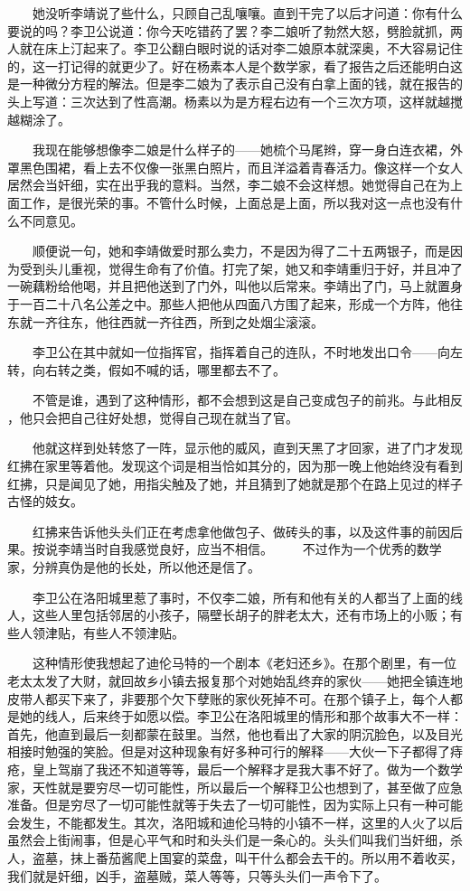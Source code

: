 　　她没听李靖说了些什么，只顾自己乱嚷嚷。直到干完了以后才问道：你有什么 要说的吗？李卫公说道：你今天吃错药了罢？李二娘听了勃然大怒，劈脸就抓，两 人就在床上汀起来了。李卫公翻白眼时说的话对李二娘原本就深奥，不大容易记住 的，这一打记得的就更少了。好在杨素本人是个数学家，看了报告之后还能明白这 是一种微分方程的解法。但是李二娘为了表示自己没有白拿上面的钱，就在报告的 头上写道：三次达到了性高潮。杨素以为是方程右边有一个三次方项，这样就越搅 越糊涂了。 

　　我现在能够想像李二娘是什么样子的——她梳个马尾辫，穿一身白连衣裙，外 罩黑色围裙，看上去不仅像一张黑白照片，而且洋溢着青春活力。像这样一个女人 居然会当奸细，实在出乎我的意料。当然，李二娘不会这样想。她觉得自己在为上 面工作，是很光荣的事。不管什么时候，上面总是上面，所以我对这一点也没有什 么不同意见。

 　　顺便说一句，她和李靖做爱时那么卖力，不是因为得了二十五两银子，而是因 为受到头儿重视，觉得生命有了价值。打完了架，她又和李靖重归于好，并且冲了 一碗藕粉给他喝，并且把他送到了门外，叫他以后常来。李靖出了门，马上就置身 于一百二十八名公差之中。那些人把他从四面八方围了起来，形成一个方阵，他往 东就一齐往东，他往西就一齐往西，所到之处烟尘滚滚。

 　　李卫公在其中就如一位指挥官，指挥着自己的连队，不时地发出口令——向左 转，向右转之类，假如不喊的话，哪里都去不了。

 　　不管是谁，遇到了这种情形，都不会想到这是自己变成包子的前兆。与此相反 ，他只会把自己往好处想，觉得自己现在就当了官。

 　　他就这样到处转悠了一阵，显示他的威风，直到天黑了才回家，进了门才发现 红拂在家里等着他。发现这个词是相当恰如其分的，因为那一晚上他始终没有看到 红拂，只是闻见了她，用指尖触及了她，并且猜到了她就是那个在路上见过的样子 古怪的妓女。

 　　红拂来告诉他头头们正在考虑拿他做包子、做砖头的事，以及这件事的前因后 果。按说李靖当时自我感觉良好，应当不相信。 　　不过作为一个优秀的数学家，分辨真伪是他的长处，所以他还是信了。

 　　李卫公在洛阳城里惹了事时，不仅李二娘，所有和他有关的人都当了上面的线 人，这些人里包括邻居的小孩子，隔壁长胡子的胖老太大，还有市场上的小贩；有 些人领津贴，有些人不领津贴。

 　　这种情形使我想起了迪伦马特的一个剧本《老妇还乡》。在那个剧里，有一位 老太太发了大财，就回故乡小镇去报复那个对她始乱终弃的家伙——她把全镇连地 皮带人都买下来了，非要那个欠下孽账的家伙死掉不可。在那个镇子上，每个人都 是她的线人，后来终于如愿以偿。李卫公在洛阳城里的情形和那个故事大不一样： 首先，他直到最后一刻都蒙在鼓里。当然，他也看出了大家的阴沉脸色，以及目光 相接时勉强的笑脸。但是对这种现象有好多种可行的解释——大伙一下子都得了痔 疮，皇上驾崩了我还不知道等等，最后一个解释才是我大事不好了。做为一个数学 家，天性就是要穷尽一切可能性，所以最后一个解释卫公也想到了，甚至做了应急 准备。但是穷尽了一切可能性就等于失去了一切可能性，因为实际上只有一种可能 会发生，不能都发生。其次，洛阳城和迪伦马特的小镇不一样，这里的人火了以后 虽然会上街闹事，但是心平气和时和头头们是一条心的。头头们叫我们当奸细，杀 人，盗墓，抹上番茄酱爬上国宴的菜盘，叫干什么都会去干的。所以用不着收买， 我们就是奸细，凶手，盗墓贼，菜人等等，只等头头们一声令下了。 
 
